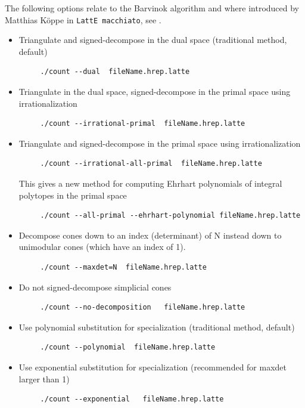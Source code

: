 \documentclass{article}
\newcommand{\latteMac}{{\tt LattE macchiato}\xspace}
\begin{document}
The following options relate to the Barvinok algorithm and where introduced by Matthias K\"oppe in \latteMac, see \cite{koeppe:irrational-barvinok}.
\begin{itemize}
\item Triangulate and signed-decompose in the dual space (traditional method, default)
	\begin{verbatim}
     ./count --dual  fileName.hrep.latte
	\end{verbatim} 
\item Triangulate in the dual space, signed-decompose in the primal space using irrationalization
	\begin{verbatim}
     ./count --irrational-primal  fileName.hrep.latte
	\end{verbatim} 
\item Triangulate and signed-decompose in the primal space  using irrationalization
	\begin{verbatim}
     ./count --irrational-all-primal  fileName.hrep.latte
	\end{verbatim} 
	This gives a new method for computing Ehrhart polynomials of integral polytopes 
   in the primal space
	\begin{verbatim}
     ./count --all-primal --ehrhart-polynomial fileName.hrep.latte
	\end{verbatim} 
   
\item  Decompose cones down to an index (determinant) of N instead down to unimodular cones (which have an index of 1).
	\begin{verbatim}
     ./count --maxdet=N  fileName.hrep.latte
	\end{verbatim} 
\item Do not signed-decompose simplicial cones
	\begin{verbatim}
     ./count --no-decomposition   fileName.hrep.latte
	\end{verbatim} 
\item Use polynomial substitution for specialization (traditional method, default)
	\begin{verbatim}
     ./count --polynomial  fileName.hrep.latte
	\end{verbatim} 	
\item Use exponential substitution for specialization (recommended for maxdet larger than 1)
	\begin{verbatim}
     ./count --exponential   fileName.hrep.latte
	\end{verbatim} 	
			
\end{itemize}
\end{document}
